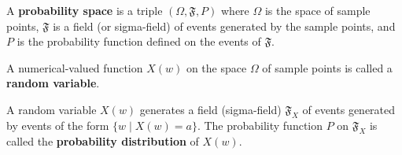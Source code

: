 A \textbf{probability space} is a triple $(\Omega, \mathfrak{F}, P)$ where $\Omega$ is the space of sample points, $\mathfrak{F}$ is a field (or sigma-field) of events generated by the sample points, and $P$ is the probability function defined on the events of $\mathfrak{F}$.

A numerical-valued function $X(w)$ on the space $\Omega$ of sample points is called a \textbf{random variable}.

A random variable $X(w)$ generates a field (sigma-field) $\mathfrak{F}_X$ of events generated by events of the form $\{w \mid X(w) = a\}$. The probability function $P$ on $\mathfrak{F}_X$ is called the \textbf{probability distribution} of $X(w)$.
